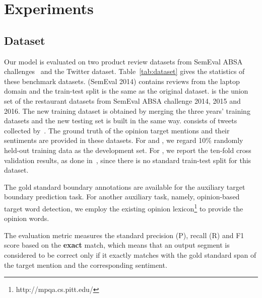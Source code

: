 \documentclass[letterpaper]{article} \usepackage{aaai19}  \usepackage{times}  \usepackage{helvet}  \usepackage{courier}  \usepackage{url}  \usepackage{graphicx}  \frenchspacing  \setlength{\pdfpagewidth}{8.5in}  \setlength{\pdfpageheight}{11in}
\begin{document}
\section{Experiments}
\subsection{Dataset}
Our model is evaluated on two product review datasets from SemEval ABSA challenges~\cite{S14-2004,S15-2082,S16-1002} and the Twitter dataset. Table~\ref{tab:dataset} gives the statistics of these benchmark datasets.  (SemEval 2014) contains reviews from the laptop domain and the train-test split is the same as the original dataset.  is the union set of the restaurant datasets from SemEval ABSA challenge 2014, 2015 and 2016. The new training dataset is obtained by merging the three years' training datasets and the new testing set is built in the same way.  consists of tweets collected by~\cite{D13-1171}. The ground truth of the opinion target mentions and their sentiments are provided in these datasets. For  and , we regard 10\% randomly held-out training data as the development set. For , we report the ten-fold cross validation results, as done in~\cite{D13-1171,D15-1073}, since there is no standard train-test split for this dataset. 

The gold standard boundary annotations are available for the auxiliary target boundary prediction task. For another auxiliary task, namely, opinion-based target word detection, we employ the existing opinion lexicon\footnote{http://mpqa.cs.pitt.edu/} to provide the opinion words. 

The evaluation metric measures the standard precision (P), recall (R) and F1 score based on the \textbf{exact} match, which means that an output segment is considered to be correct only if it exactly matches with the gold standard span of the target mention and the corresponding sentiment. 
\end{document}
